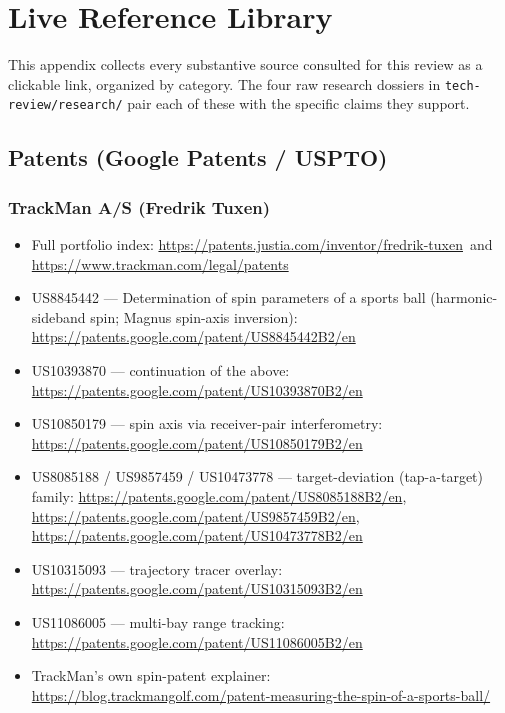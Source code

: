 \chapter{Live Reference Library}
\label{app:links}

This appendix collects every substantive source consulted for this review
as a clickable link, organized by category. The four raw research
dossiers in \texttt{tech-review/research/} pair each of these with the
specific claims they support.

\section{Patents (Google Patents / USPTO)}

\subsection*{TrackMan A/S (Fredrik Tuxen)}
\begin{itemize}\small
\item Full portfolio index:
  \url{https://patents.justia.com/inventor/fredrik-tuxen} \,and\,
  \url{https://www.trackman.com/legal/patents}
\item US8845442 --- Determination of spin parameters of a sports ball
  (harmonic-sideband spin; Magnus spin-axis inversion):
  \url{https://patents.google.com/patent/US8845442B2/en}
\item US10393870 --- continuation of the above:
  \url{https://patents.google.com/patent/US10393870B2/en}
\item US10850179 --- spin axis via receiver-pair interferometry:
  \url{https://patents.google.com/patent/US10850179B2/en}
\item US8085188 / US9857459 / US10473778 --- target-deviation
  (tap-a-target) family:
  \url{https://patents.google.com/patent/US8085188B2/en},
  \url{https://patents.google.com/patent/US9857459B2/en},
  \url{https://patents.google.com/patent/US10473778B2/en}
\item US10315093 --- trajectory tracer overlay:
  \url{https://patents.google.com/patent/US10315093B2/en}
\item US11086005 --- multi-bay range tracking:
  \url{https://patents.google.com/patent/US11086005B2/en}
\item TrackMan's own spin-patent explainer:
  \url{https://blog.trackmangolf.com/patent-measuring-the-spin-of-a-sports-ball/}
\end{itemize}

